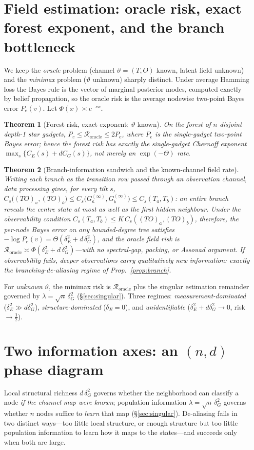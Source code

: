 \documentclass[11pt]{article}
\theoremstyle{plain}
\newtheorem{theorem}{Theorem}\newtheorem{proposition}{Proposition}\newtheorem{corollary}{Corollary}
\theoremstyle{definition}\newtheorem{definition}{Definition}\newtheorem{assumption}{Assumption}
\begin{document}
\section{Field estimation: oracle risk, exact forest exponent, and the branch bottleneck}\label{sec:field}
We keep the \emph{oracle} problem (channel $\vartheta{=}(T,O)$ known, latent field unknown) and the \emph{minimax}
problem ($\vartheta$ unknown) sharply distinct. Under average Hamming loss the Bayes rule is the vector of marginal
posterior modes, computed exactly by belief propagation, so the oracle risk is the average nodewise two-point
Bayes error $P_e(v)$. Let $\Phi(x)\asymp e^{-cx}$.
\begin{theorem}[Forest risk, exact exponent; $\vartheta$ known]\label{thm:forest}
On the forest of $n$ disjoint depth-1 star gadgets, $P_e\le\mathcal R_{\mathrm{oracle}}\le 2P_e$, where $P_e$ is the
single-gadget two-point Bayes error; hence the forest risk has \emph{exactly} the single-gadget Chernoff exponent
$\max_s\{C_E(s)+dC_G(s)\}$, not merely an $\exp(-\Theta)$ rate.
\end{theorem}
\begin{theorem}[Branch-information sandwich and the known-channel field rate]\label{thm:sandwich}
Writing each branch as the transition row passed through an observation channel, data processing gives, for every
tilt $s$, $C_s\big((TO)_a,(TO)_b\big)\le C_s\big(G_a^{(\infty)},G_b^{(\infty)}\big)\le C_s(T_a,T_b)$: an entire
branch reveals the centre state at most as well as the first hidden neighbour. Under the observability condition
$C_s(T_a,T_b)\le K\,C_s((TO)_a,(TO)_b)$, therefore, the per-node Bayes error on \emph{any} bounded-degree tree
satisfies $-\log P_e(v)=\Theta(\delta_E^2+d\,\delta_G^2)$, and the oracle field risk is
$\mathcal R_{\mathrm{oracle}}\asymp\Phi(\delta_E^2+d\,\delta_G^2)$---with no spectral-gap, packing, or Assouad
argument. If observability fails, deeper observations carry qualitatively new information: exactly the
branching-de-aliasing regime of Prop.~\ref{prop:branch}.
\end{theorem}
\noindent For \emph{unknown} $\vartheta$, the minimax risk is $\mathcal R_{\mathrm{oracle}}$ plus the singular
estimation remainder governed by $\lambda=\sqrt n\,\delta_G^2$ (\S\ref{sec:singular}). Three regimes:
\emph{measurement-dominated} ($\delta_E^2\gg d\delta_G^2$), \emph{structure-dominated} ($\delta_E=0$), and
\emph{unidentifiable} ($\delta_E^2+d\delta_G^2\to0$, risk $\to\tfrac12$).

\section{Two information axes: an $(n,d)$ phase diagram}\label{sec:phase}
Local structural richness $d\,\delta_G^2$ governs whether the neighborhood can classify a node \emph{if the
channel map were known}; population information $\lambda=\sqrt n\,\delta_G^2$ governs whether $n$ nodes suffice to
\emph{learn} that map (\S\ref{sec:singular}). De-aliasing fails in two distinct ways---too little local structure,
or enough structure but too little population information to learn how it maps to the states---and succeeds only
when both are large.
\end{document}

